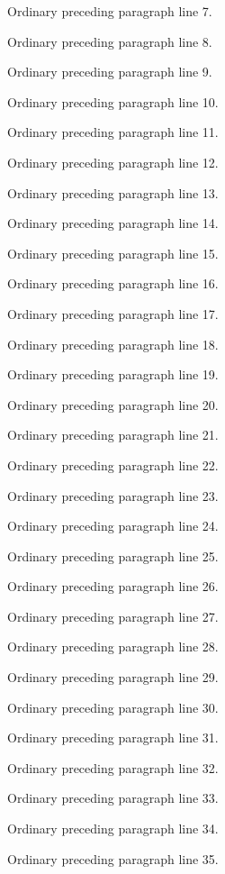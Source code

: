 \documentclass[11pt]{article}
\begin{document}
\noindent Ordinary preceding paragraph line 7.\par
\noindent Ordinary preceding paragraph line 8.\par
\noindent Ordinary preceding paragraph line 9.\par
\noindent Ordinary preceding paragraph line 10.\par
\noindent Ordinary preceding paragraph line 11.\par
\noindent Ordinary preceding paragraph line 12.\par
\noindent Ordinary preceding paragraph line 13.\par
\noindent Ordinary preceding paragraph line 14.\par
\noindent Ordinary preceding paragraph line 15.\par
\noindent Ordinary preceding paragraph line 16.\par
\noindent Ordinary preceding paragraph line 17.\par
\noindent Ordinary preceding paragraph line 18.\par
\noindent Ordinary preceding paragraph line 19.\par
\noindent Ordinary preceding paragraph line 20.\par
\noindent Ordinary preceding paragraph line 21.\par
\noindent Ordinary preceding paragraph line 22.\par
\noindent Ordinary preceding paragraph line 23.\par
\noindent Ordinary preceding paragraph line 24.\par
\noindent Ordinary preceding paragraph line 25.\par
\noindent Ordinary preceding paragraph line 26.\par
\noindent Ordinary preceding paragraph line 27.\par
\noindent Ordinary preceding paragraph line 28.\par
\noindent Ordinary preceding paragraph line 29.\par
\noindent Ordinary preceding paragraph line 30.\par
\noindent Ordinary preceding paragraph line 31.\par
\noindent Ordinary preceding paragraph line 32.\par
\noindent Ordinary preceding paragraph line 33.\par
\noindent Ordinary preceding paragraph line 34.\par
\noindent Ordinary preceding paragraph line 35.\par
\end{document}
